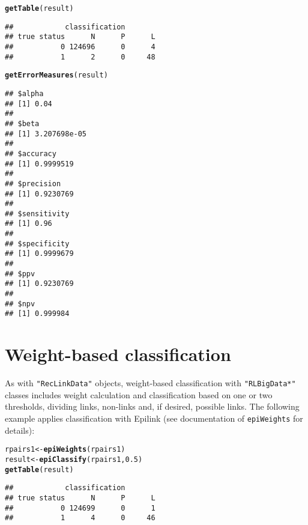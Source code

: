\documentclass[a4paper]{article}\usepackage[]{graphicx}\usepackage[]{color}
\makeatletter
\newcommand{\hlnum}[1]{\textcolor[rgb]{0.686,0.059,0.569}{#1}}%
\newcommand{\hlstd}[1]{\textcolor[rgb]{0.345,0.345,0.345}{#1}}%
\newcommand{\hlkwb}[1]{\textcolor[rgb]{0.69,0.353,0.396}{#1}}%
\newcommand{\hlkwd}[1]{\textcolor[rgb]{0.737,0.353,0.396}{\textbf{#1}}}%
\newenvironment{kframe}{%
 \def\at@end@of@kframe{}%
 \ifinner\ifhmode%
  \def\at@end@of@kframe{\end{minipage}}%
  \begin{minipage}{\columnwidth}%
 \fi\fi%
 \def\FrameCommand##1{\hskip\@totalleftmargin \hskip-\fboxsep
 \colorbox{shadecolor}{##1}\hskip-\fboxsep
     \hskip-\linewidth \hskip-\@totalleftmargin \hskip\columnwidth}%
 \MakeFramed {\advance\hsize-\width
   \@totalleftmargin\z@ \linewidth\hsize
   \@setminipage}}%
 {\par\unskip\endMakeFramed%
 \at@end@of@kframe}
\newenvironment{knitrout}{}{} %
\makeatother
\begin{document}
\begin{knitrout}
\color{fgcolor}\begin{kframe}
\begin{alltt}
\hlkwd{getTable}\hlstd{(result)}
\end{alltt}
\begin{verbatim}
##            classification
## true status      N      P      L
##           0 124696      0      4
##           1      2      0     48
\end{verbatim}
\begin{alltt}
\hlkwd{getErrorMeasures}\hlstd{(result)}
\end{alltt}
\begin{verbatim}
## $alpha
## [1] 0.04
## 
## $beta
## [1] 3.207698e-05
## 
## $accuracy
## [1] 0.9999519
## 
## $precision
## [1] 0.9230769
## 
## $sensitivity
## [1] 0.96
## 
## $specificity
## [1] 0.9999679
## 
## $ppv
## [1] 0.9230769
## 
## $npv
## [1] 0.999984
\end{verbatim}
\end{kframe}
\end{knitrout}

\section{Weight-based classification}

As with \texttt{"RecLinkData"} objects, weight-based classification with
\texttt{"RLBigData*"} classes includes weight calculation and classification
based on one or two thresholds, dividing links, non-links and, if desired,
possible links. The following example applies classification with
Epilink (see documentation of \texttt{epiWeights} for details):
\begin{knitrout}
\color{fgcolor}\begin{kframe}
\begin{alltt}
\hlstd{rpairs1} \hlkwb{<-} \hlkwd{epiWeights}\hlstd{(rpairs1)}
\hlstd{result} \hlkwb{<-} \hlkwd{epiClassify}\hlstd{(rpairs1,} \hlnum{0.5}\hlstd{)}
\hlkwd{getTable}\hlstd{(result)}
\end{alltt}
\begin{verbatim}
##            classification
## true status      N      P      L
##           0 124699      0      1
##           1      4      0     46
\end{verbatim}
\end{kframe}
\end{knitrout}
\end{document}
